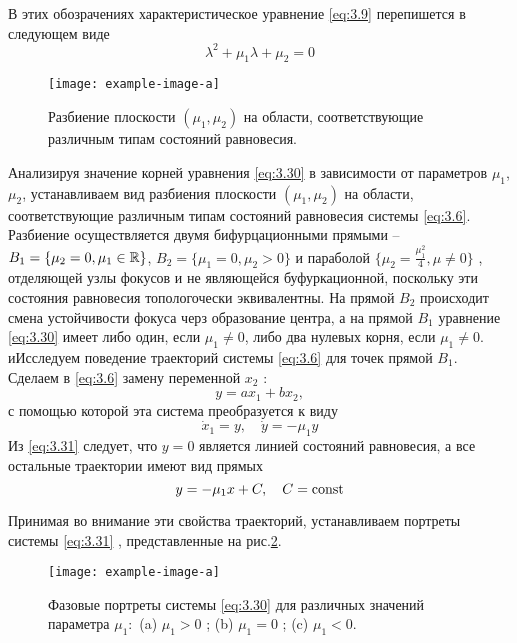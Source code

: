 В этих обозрачениях характеристическое уравнение \eqref{eq:3.9} перепишется в следующем виде
\begin{equation}
        \label{eq:3.30}
       \lambda^2 + \mu_1 \lambda + \mu_2 =0 
\end{equation}
\begin{figure}[h!]
        \centering
        \texttt{[image: example-image-a]}
        \label{fig:3.8}
        \caption{Разбиение плоскости $(\mu_1,\mu_2)$ на области, соответствующие различным типам состояний равновесия.}
\end{figure}
Анализируя значение корней уравнения \eqref{eq:3.30} в зависимости от параметров $\mu_1$, $\mu_2$, устанавливаем вид разбиения плоскости $( \mu_1, \mu_2)$ на области, соответствующие различным типам состояний равновесия системы \eqref{eq:3.6}. Разбиение осуществляется двумя бифурцационными прямыми --$B_1 = \{ \mu_2=0, \mu_1 \in \mathbb{R} \}$, $B_2=\{\mu_1=0, \mu_2>0\}$ и параболой $\{ \mu_2= \frac{\mu_1^2}{4}, \mu \neq 0 \}   $
, отделяющей узлы фокусов и не являющейся буфуркационной, поскольку эти состояния равновесия топологочески эквивалентны. На прямой $B_2$ происходит смена устойчивости фокуса черз образование центра, а на прямой $B_1$ уравнение \eqref{eq:3.30} имеет либо один, если $\mu_1 \neq 0$, либо два нулевых корня, если $\mu_1\neq 0$. иИсследуем поведение траекторий системы \eqref{eq:3.6} для точек прямой $B_1$. Сделаем в \eqref{eq:3.6} замену переменной $x_2$ :
\begin{equation}
        \label{eq:}
        y= ax_1 + bx_2,
\end{equation}
с помощью которой эта система преобразуется к виду
\begin{equation}
        \label{eq:3.31}
        \dot x_1 = y, \quad \dot y = - \mu_1 y  
\end{equation}
Из \eqref{eq:3.31} следует, что $y=0$ является линией состояний равновесия, а все остальные траектории имеют вид прямых
\begin{equation}
        \label{eq:}
        y= - \mu_1x +C, \quad C=\textrm{const}
\end{equation}

Принимая во внимание эти свойства траекторий, устанавливаем портреты системы \eqref{eq:3.31} , представленные на рис.\ref{fig:3.9}.
        
\begin{figure}[h!]
        \centering
        \texttt{[image: example-image-a]}
        \label{fig:3.9}
        \caption{Фазовые портреты системы \eqref{eq:3.30}  для различных значений параметра $\mu_1:$ 
        (a) $\mu_1>0$ ; (b) $\mu_1=0$ ; (c) $\mu_1<0$.}
\end{figure}
